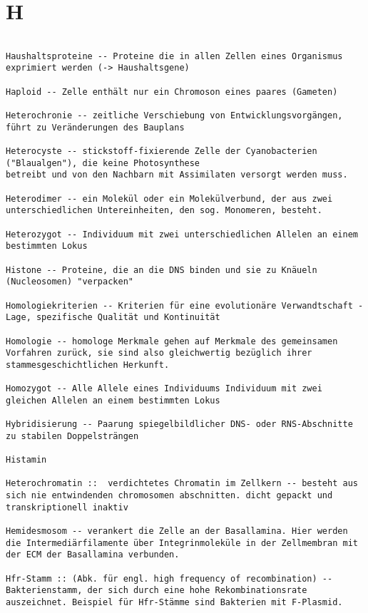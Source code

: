 \documentclass{article}
\begin{document}
\section{H}
\begin{verbatim}

Haushaltsproteine -- Proteine die in allen Zellen eines Organismus exprimiert werden (-> Haushaltsgene)

Haploid -- Zelle enthält nur ein Chromoson eines paares (Gameten)

Heterochronie -- zeitliche Verschiebung von Entwicklungsvorgängen, führt zu Veränderungen des Bauplans

Heterocyste -- stickstoff-fixierende Zelle der Cyanobacterien ("Blaualgen"), die keine Photosynthese
betreibt und von den Nachbarn mit Assimilaten versorgt werden muss.

Heterodimer -- ein Molekül oder ein Molekülverbund, der aus zwei unterschiedlichen Untereinheiten, den sog. Monomeren, besteht.

Heterozygot -- Individuum mit zwei unterschiedlichen Allelen an einem bestimmten Lokus

Histone -- Proteine, die an die DNS binden und sie zu Knäueln (Nucleosomen) "verpacken"

Homologiekriterien -- Kriterien für eine evolutionäre Verwandtschaft - Lage, spezifische Qualität und Kontinuität

Homologie -- homologe Merkmale gehen auf Merkmale des gemeinsamen Vorfahren zurück, sie sind also gleichwertig bezüglich ihrer stammesgeschichtlichen Herkunft.

Homozygot -- Alle Allele eines Individuums Individuum mit zwei gleichen Allelen an einem bestimmten Lokus

Hybridisierung -- Paarung spiegelbildlicher DNS- oder RNS-Abschnitte zu stabilen Doppelsträngen

Histamin

Heterochromatin ::  verdichtetes Chromatin im Zellkern -- besteht aus sich nie entwindenden chromosomen abschnitten. dicht gepackt und transkriptionell inaktiv

Hemidesmosom -- verankert die Zelle an der Basallamina. Hier werden die Intermediärfilamente über Integrinmoleküle in der Zellmembran mit der ECM der Basallamina verbunden.

Hfr-Stamm :: (Abk. für engl. high frequency of recombination) -- Bakterienstamm, der sich durch eine hohe Rekombinationsrate auszeichnet. Beispiel für Hfr-Stämme sind Bakterien mit F-Plasmid.

\end{verbatim}
\newpage
\end{document}
